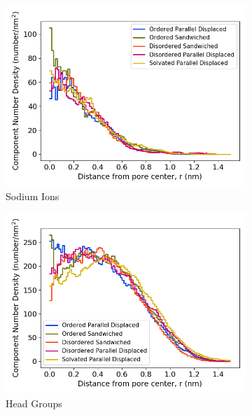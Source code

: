 \documentclass[journal=jpcbfk,manusciprt=article]{achemso}
\begin{document}
  \begin{figure}[!htb]
  \centering
  \begin{subfigure}{0.32\textwidth}
        \includegraphics[width=1\linewidth]{sodium_density.png}
        \caption{Sodium Ions}
        \label{fig:sodium_regional_density}
  \end{subfigure}
  \begin{subfigure}{0.32\textwidth}
        \includegraphics[width=1\linewidth]{head_group_density.png}
        \caption{Head Groups}
        \label{fig:head_groups_regional_density}
  \end{subfigure}
  \begin{subfigure}{0.32\textwidth}

\end{subfigure}
\end{figure}
\end{document}
